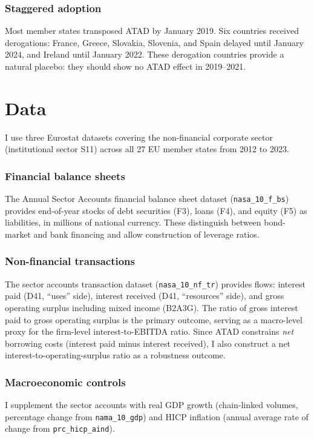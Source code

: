 \documentclass[12pt]{article}
\begin{document}
\subsubsection*{Staggered adoption} Most member states transposed ATAD by January 2019. Six countries received derogations: France, Greece, Slovakia, Slovenia, and Spain delayed until January 2024, and Ireland until January 2022. These derogation countries provide a natural placebo: they should show no ATAD effect in 2019--2021.


\section{Data}

I use three Eurostat datasets covering the non-financial corporate sector (institutional sector S11) across all 27 EU member states from 2012 to 2023.

\subsubsection*{Financial balance sheets} The Annual Sector Accounts financial balance sheet dataset (\texttt{nasa\_10\_f\_bs}) provides end-of-year stocks of debt securities (F3), loans (F4), and equity (F5) as liabilities, in millions of national currency. These distinguish between bond-market and bank financing and allow construction of leverage ratios.

\subsubsection*{Non-financial transactions} The sector accounts transaction dataset (\texttt{nasa\_10\_nf\_tr}) provides flows: interest paid (D41, ``uses'' side), interest received (D41, ``resources'' side), and gross operating surplus including mixed income (B2A3G). The ratio of gross interest paid to gross operating surplus is the primary outcome, serving as a macro-level proxy for the firm-level interest-to-EBITDA ratio. Since ATAD constrains \textit{net} borrowing costs (interest paid minus interest received), I also construct a net interest-to-operating-surplus ratio as a robustness outcome.

\subsubsection*{Macroeconomic controls} I supplement the sector accounts with real GDP growth (chain-linked volumes, percentage change from \texttt{nama\_10\_gdp}) and HICP inflation (annual average rate of change from \texttt{prc\_hicp\_aind}).
\end{document}
